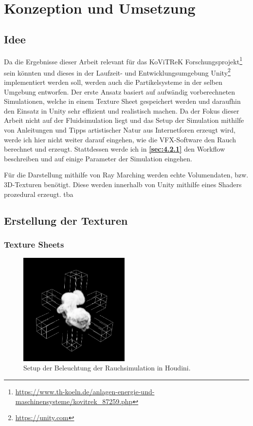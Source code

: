 \section{Konzeption und Umsetzung}
\label{sec:4}
\subsection{Idee}
\label{sec:4.1}

Da die Ergebnisse dieser Arbeit relevant für das KoViTReK Forschungsprojekt\footnote{\url{https://www.th-koeln.de/anlagen-energie-und-maschinensysteme/kovitrek\_87259.php}}
sein könnten und dieses in der Laufzeit- und Entwicklungsumgebung Unity\footnote{\url{https://unity.com}}
implementiert werden soll, werden auch die Partikelsysteme in der selben Umgebung entworfen.
Der erste Ansatz basiert auf aufwändig vorberechneten Simulationen, welche in einem Texture Sheet gespeichert werden und daraufhin den Einsatz in Unity
sehr effizient und realistisch machen. Da der Fokus dieser Arbeit nicht auf der Fluidsimulation liegt und das Setup der Simulation mithilfe von Anleitungen
und Tipps artistischer Natur aus Internetforen erzeugt wird, werde ich hier nicht weiter darauf eingehen, wie die VFX-Software den Rauch berechnet und erzeugt.
Stattdessen werde ich in \textbf{\autoref{sec:4.2.1}} den Workflow beschreiben und auf einige Parameter der Simulation eingehen.

Für die Darstellung mithilfe von Ray Marching werden echte Volumendaten, bzw. 3D-Texturen benötigt. Diese werden innerhalb von Unity
mithilfe eines Shaders prozedural erzeugt. tba


\subsection{Erstellung der Texturen}
\label{sec:4.2}


\subsubsection{Texture Sheets}
\label{sec:4.2.1}
\begin{figure}[h!]
	\includegraphics[width=0.49\textwidth]{Grafiken/Implementation/Lightmaps/Smoke_LightSetup.png}
	\centering
	\begin{footnotesize}
		\caption{Setup der Beleuchtung der Rauchsimulation in Houdini.}
		\label{fig:lightSetup}
	\end{footnotesize}
\end{figure}

